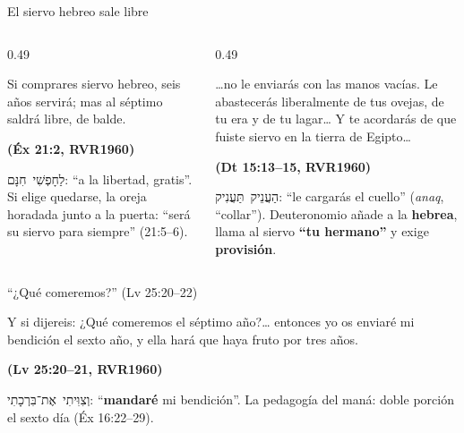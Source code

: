 \documentclass[hyperref={bookmarks=false},aspectratio=169]{beamer}
\newcommand{\heb}[1]{\mbox{\foreignlanguage{hebrew}{#1}}}
\newcommand{\fuente}[1]{\par\hfill{\upshape\bfseries\footnotesize\textcolor{tierraroja}{#1}}}
\newcommand{\destacar}[1]{\textbf{\textcolor{tierraroja}{#1}}}
\begin{document}
\begin{frame}{El siervo hebreo sale libre}
\begin{columns}[t,onlytextwidth]
\begin{column}{0.49\textwidth}
\begin{cita}Si comprares siervo hebreo, seis años servirá; mas al séptimo saldrá libre, de balde.\fuente{(Éx 21:2, RVR1960)}\end{cita}
\scriptsize \heb{לַחָפְשִׁי חִנָּם}: ``a la libertad, gratis''. Si elige quedarse, la oreja horadada junto a la puerta: ``será su siervo para siempre'' (21:5--6).
\end{column}
\begin{column}{0.49\textwidth}
\begin{cita}\ldots{}no le enviarás con las manos vacías. Le abastecerás liberalmente de tus ovejas, de tu era y de tu lagar\ldots{} Y te acordarás de que fuiste siervo en la tierra de Egipto\ldots\fuente{(Dt 15:13--15, RVR1960)}\end{cita}
\scriptsize \heb{הַעֲנֵיק תַּעֲנִיק}: ``le cargarás el cuello'' (\emph{anaq}, ``collar''). Deuteronomio añade a la \destacar{hebrea}, llama al siervo \destacar{``tu hermano''} y exige \destacar{provisión}.
\end{column}
\end{columns}
\end{frame}

\begin{frame}{``¿Qué comeremos?'' (Lv 25:20--22)}
\begin{cita}Y si dijereis: ¿Qué comeremos el séptimo año?\ldots{} entonces yo os enviaré mi bendición el sexto año, y ella hará que haya fruto por tres años.\fuente{(Lv 25:20--21, RVR1960)}\end{cita}
\centering
{}\par\smallskip
\small\RaggedRight \heb{וְצִוִּיתִי אֶת־בִּרְכָתִי}: ``\destacar{mandaré} mi bendición''. La pedagogía del maná: doble porción el sexto día (Éx 16:22--29).
\end{frame}
\end{document}
